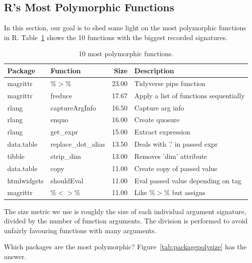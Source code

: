 \documentclass[acmsmall,10pt,review,anonymous]{acmart}\settopmatter{printfolios=true,printccs=false,printacmref=false}
\begin{document}
%
%
%
%
\subsection{R's Most Polymorphic Functions}


In this section, our goal is to shed some light on the most polymorphic functions in R.
Table~\ref{tab:bigpolyfuns} shows the 10 functions with the biggest recorded signatures.

\begin{table}[ht]
\label{tab:bigpolyfuns}
\centering
\begin{tabular}{llrl}
  \hline
Package & Function & Size & Description \\
  \hline
magrittr & \%$>$\% & 23.00 & Tidyverse pipe function \\
  magrittr & freduce & 17.67 & Apply a list of functions sequentially \\
  rlang & captureArgInfo & 16.50 & Capture arg info \\
  rlang & enquo & 16.00 & Create quosure \\
  rlang & get\_expr & 15.00 & Extract expression \\
  data.table & replace\_dot\_alias & 13.50 & Deals with '.' in passed expr \\
  tibble & strip\_dim & 13.00 & Removes 'dim' attribute \\
  data.table & copy & 11.00 & Create copy of passed value \\
  htmlwidgets & shouldEval & 11.00 & Eval passed value depending on tag \\
  magrittr & \%$<$$>$\% & 11.00 & Like \%$>$\% but assigns \\
   \hline
\end{tabular}
\caption{10 most polymorphic functions.}
\end{table}

The size metric we use is roughly the size of each individual argument signature, divided by the number of function arguments.
The division is performed to avoid unfairly favouring functions with many arguments.

Which packages are the most polymorphic?
Figure~\ref{tab:packagepolysize} has the answer.
\end{document}
